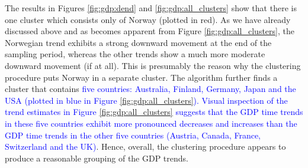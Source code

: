 \documentclass[a4paper,12pt]{article}
\begin{document}
The results in Figures \ref{fig:gdp:dend} and \ref{fig:gdp:all_clusters} show that there is one cluster which consists only of Norway (plotted in red). As we have already discussed above and as becomes apparent from Figure \ref{fig:gdp:all_clusters}, the Norwegian trend exhibits a strong downward movement at the end of the sampling period, whereas the other trends show a much more moderate downward movement (if at all). This is presumably the reason why the clustering procedure puts Norway in a separate cluster. 
The algorithm further finds a cluster that contains \textcolor{blue}{five countries: Australia, Finland, Germany, Japan and the USA (plotted in blue in Figure \ref{fig:gdp:all_clusters}). Visual inspection of the trend estimates in Figure \ref{fig:gdp:all_clusters} suggests that the GDP time trends in these five countries exhibit more pronounced decreases and increases than the GDP time trends in the other five countries (Austria, Canada, France, Switzerland and the UK)}. Hence, overall, the clustering procedure appears to produce a reasonable grouping of the GDP trends.

\end{document}
